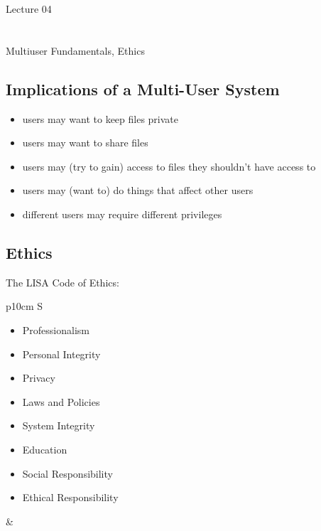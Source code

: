 \documentclass[xga]{xdvislides}
\begin{document}
\newpage
\vspace*{\fill}
\begin{center}
    \Hugesize
        Lecture 04 \\ [1em]
    \hspace*{5mm}
    \blueline\\
    \hspace*{5mm}\\
	Multiuser Fundamentals, Ethics
\end{center}
\vspace*{\fill}

\subsection{Implications of a Multi-User System}
\begin{itemize}
	\item users may want to keep files private
	\item users may want to share files
	\item users may (try to gain) access to files they shouldn't have access to
	\item users may (want to) do things that affect other users
	\item different users may require different privileges
\end{itemize}

\subsection{Ethics}
The LISA Code of Ethics:
\\

\begin{tabular}{ p{10cm} S }
\begin{itemize}
	\item Professionalism
	\item Personal Integrity
	\item Privacy
	\item Laws and Policies
	\item System Integrity
	\item Education
	\item Social Responsibility
	\item Ethical Responsibility
\end{itemize}
&  \\
\end{tabular}
\end{document}

